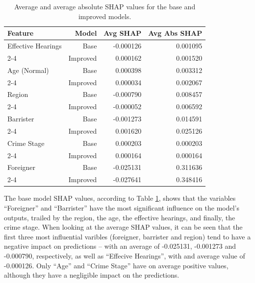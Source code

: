 \documentclass[twoside,11pt]{article}
\begin{document}
\begin{table}[h!]
\centering
\begin{tabular}{|l|r|r|r|}
\hline
\textbf{Feature} & \textbf{Model} & \textbf{Avg SHAP} & \textbf{Avg Abs SHAP} \\ \hline
Effective Hearings & Base      & -0.000126 &  0.001095  \\ \cline{2-4}
                   & Improved  &  0.000162 &   0.001520  \\ \hline
Age (Normal)         & Base      &  0.000398 &  0.003312  \\ \cline{2-4}
                   & Improved  &  0.000034 &  0.002067  \\ \hline
Region             & Base      &  -0.000790 &  0.008457  \\ \cline{2-4}
                   & Improved  &  -0.000052 &  0.006592  \\ \hline
Barrister          & Base      & -0.001273 &  0.014591  \\ \cline{2-4}
                   & Improved  &  0.001620 &  0.025126  \\ \hline
Crime Stage        & Base      &  0.000203 &  0.000203 \\ \cline{2-4}
                   & Improved  &  0.000164 &  0.000164  \\ \hline
Foreigner          & Base      & -0.025131 &  0.311636  \\ \cline{2-4}
                   & Improved  &  -0.027641 &  0.348416  \\ \hline
\end{tabular}
\caption{Average and average absolute SHAP values for the base and improved models.}
\label{tab:dt_shap_stats_base_improved}
\end{table}

\clearpage

The base model SHAP values, according to Table \ref{tab:dt_shap_stats_base_improved}, shows that the variables ``Foreigner'' and ``Barrister'' have the most significant influence on the model's outputs, trailed by the region, the age, the effective hearings, and finally, the crime stage. When looking at the average SHAP values, it can be seen that the first three most influential varibles (foreigner, barrister and region) tend to have a negative impact on predictions -- with an average of -0.025131, -0.001273 and -0.000790, respectively, as well as ``Effecive Hearings'', with and average value of -0.000126. Only ``Age'' and ``Crime Stage'' have on average positive values, although they have a negligible impact on the predictions.
\end{document}
